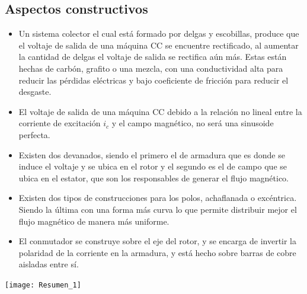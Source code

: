 \documentclass[
  11pt,
  letterpaper,
   addpoints,
   answers
  ]{exam}
\begin{document}
\subsection*{Aspectos constructivos}
\begin{minipage}{0.6\textwidth} %
  \begin{itemize}
      \item Un sistema colector el cual está formado por delgas y escobillas, produce que el voltaje de salida de una máquina CC se encuentre rectificado, al aumentar la cantidad de delgas el voltaje de salida se rectifica aún más. Estas están hechas de carbón, grafito o una mezcla, con una conductividad alta para reducir las pérdidas eléctricas y bajo coeficiente de fricción para reducir el desgaste.
      \item El voltaje de salida de una máquina CC debido a la relación no lineal entre la corriente de excitación $i_{c}$ y el campo magnético, no será una sinusoide perfecta.
      \item Existen dos devanados, siendo el primero el de armadura que es donde se induce el voltaje y se ubica en el rotor y el segundo es el de campo que se ubica en el estator, que son los responsables de generar el flujo magnético.
      \item Existen dos tipos de construcciones para los polos, achaflanada o excéntrica. Siendo la última con una forma más curva lo que permite distribuir mejor el flujo magnético de manera más uniforme.
      \item El conmutador se construye sobre el eje del rotor, y se encarga de invertir la polaridad de la corriente en la armadura, y está hecho sobre barras de cobre aisladas entre sí.
  \end{itemize}
\end{minipage}%
\hfill
\begin{minipage}{0.35\textwidth} 
  \centering
  \texttt{[image: Resumen\_1]} 
\end{minipage}
\end{document}
